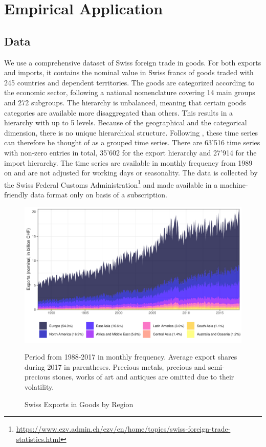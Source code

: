\documentclass[a4paper,fleqn,11pt]{article}
\begin{document}
\clearpage


\section{Empirical Application}
\label{sec:appl}
\subsection{Data}
We use a comprehensive dataset of Swiss foreign trade in goods. For both exports and imports, it contains the nominal value in Swiss francs of goods traded with 245 countries and dependent territories. The goods are categorized according to the economic sector, following a national nomenclature covering 14 main groups and 272 subgroups. The hierarchy is unbalanced, meaning that certain goods categories are available more disaggregated than others. This results in a hierarchy with up to 5 levels. Because of the geographical and the categorical dimension, there is no unique hierarchical structure. Following \cite{Hyndman2016}, these time series can therefore be thought of as a grouped time series. There are 63'516 time series with non-zero entries in total, 35'602 for the export hierarchy and 27'914 for the import hierarchy. The time series are available in monthly frequency from 1989 on and are not adjusted for working days or seasonality. The data is collected by the Swiss Federal Customs Administration\footnote{\url{https://www.ezv.admin.ch/ezv/en/home/topics/swiss-foreign-trade-statistics.html}} and made available in a machine-friendly data format only on basis of a subscription.\\
\begin{figure}[H]
	\includegraphics[width=\textwidth]{fig/fig_area_reg}
	\caption{Swiss Exports in Goods by Region}
	\footnotesize{Period from 1988-2017 in monthly frequency. Average export shares during 2017 in parentheses. Precious metals, precious and semi-precious stones, works of art and antiques are omitted due to their volatility.}
\end{figure}
\end{document}
